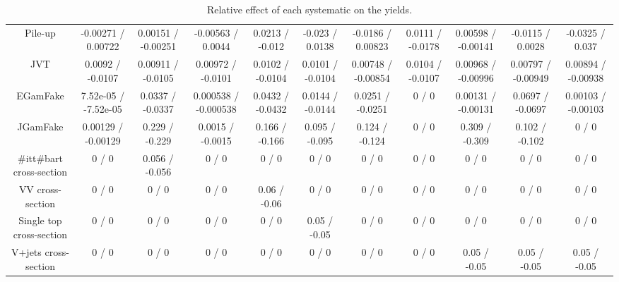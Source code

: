 \begin{table}[htbp]
\begin{center}
\begin{tabular}{|c|c|c|c|c|c|c|c|c|c|c|}
  Pile-up & -0.00271 / 0.00722 & 0.00151 / -0.00251 & -0.00563 / 0.0044 & 0.0213 / -0.012 & -0.023 / 0.0138 & -0.0186 / 0.00823 & 0.0111 / -0.0178 & 0.00598 / -0.00141 & -0.0115 / 0.0028 & -0.0325 / 0.037 \\ 
  JVT & 0.0092 / -0.0107 & 0.00911 / -0.0105 & 0.00972 / -0.0101 & 0.0102 / -0.0104 & 0.0101 / -0.0104 & 0.00748 / -0.00854 & 0.0104 / -0.0107 & 0.00968 / -0.00996 & 0.00797 / -0.00949 & 0.00894 / -0.00938 \\ 
  EGamFake & 7.52e-05 / -7.52e-05 & 0.0337 / -0.0337 & 0.000538 / -0.000538 & 0.0432 / -0.0432 & 0.0144 / -0.0144 & 0.0251 / -0.0251 & 0 / 0 & 0.00131 / -0.00131 & 0.0697 / -0.0697 & 0.00103 / -0.00103 \\ 
  JGamFake & 0.00129 / -0.00129 & 0.229 / -0.229 & 0.0015 / -0.0015 & 0.166 / -0.166 & 0.095 / -0.095 & 0.124 / -0.124 & 0 / 0 & 0.309 / -0.309 & 0.102 / -0.102 & 0 / 0 \\ 
  #it{t#bar{t}} cross-section & 0 / 0 & 0.056 / -0.056 & 0 / 0 & 0 / 0 & 0 / 0 & 0 / 0 & 0 / 0 & 0 / 0 & 0 / 0 & 0 / 0 \\ 
  VV cross-section & 0 / 0 & 0 / 0 & 0 / 0 & 0.06 / -0.06 & 0 / 0 & 0 / 0 & 0 / 0 & 0 / 0 & 0 / 0 & 0 / 0 \\ 
  Single top cross-section & 0 / 0 & 0 / 0 & 0 / 0 & 0 / 0 & 0.05 / -0.05 & 0 / 0 & 0 / 0 & 0 / 0 & 0 / 0 & 0 / 0 \\ 
  V+jets cross-section & 0 / 0 & 0 / 0 & 0 / 0 & 0 / 0 & 0 / 0 & 0 / 0 & 0 / 0 & 0.05 / -0.05 & 0.05 / -0.05 & 0.05 / -0.05 \\ 
\hline 
\end{tabular} 
\caption{Relative effect of each systematic on the yields.} 
\end{center} 
\end{table} 
